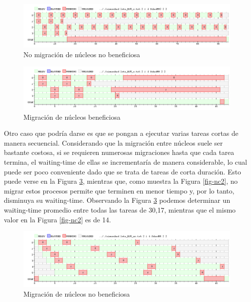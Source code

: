 \begin{figure}[!htb]
\begin{center}
  \includegraphics[scale=0.45]{imagenes/rr2-conviene.png}
\end{center}
\caption{No migración de núcleos no beneficiosa}\label{fig-c2}
\end{figure}

\begin{figure}[!htb]
\begin{center}
  \includegraphics[scale=0.45]{imagenes/rr-conviene.png}
\end{center}
\caption{Migración de núcleos beneficiosa}\label{fig-c1}
\end{figure}

Otro caso que podría darse es que se pongan a ejecutar varias tareas cortas de manera secuencial.  Considerando que la migración entre núcleos suele ser bastante costosa, si se requieren numerosas migraciones hasta que cada tarea termina, el waiting-time de ellas se incrementaría de manera considerable, lo cual puede ser poco conveniente dado que se trata de tareas de corta duración.  Esto puede verse en la Figura \ref{fig-nc1}, mientras que, como muestra la Figura \ref{fig-nc2}, no migrar estos procesos permite que terminen en menor tiempo y, por lo tanto, disminuya su waiting-time.  Observando la Figura \ref{fig-nc1} podemos determinar un waiting-time promedio entre todas las tareas de 30,17, mientras que el mismo valor en la Figura \ref{fig-nc2} es de 14.

\begin{figure}[!htb]
\begin{center}
  \includegraphics[scale=0.45]{imagenes/rr-noconviene.png}
\end{center}
\caption{Migración de núcleos no beneficiosa}\label{fig-nc1}
\end{figure}

